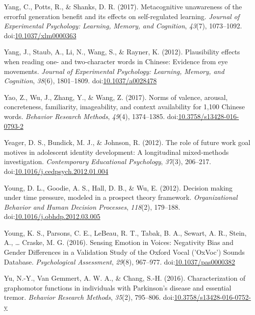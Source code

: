 \documentclass[english,man]{apa6}
\theoremstyle{definition}
\theoremstyle{definition}
\theoremstyle{definition}
\theoremstyle{remark}
\begin{document}
\hypertarget{ref-Yang2017}{}
Yang, C., Potts, R., \& Shanks, D. R. (2017). Metacognitive unawareness
of the errorful generation benefit and its effects on self-regulated
learning. \emph{Journal of Experimental Psychology: Learning, Memory,
and Cognition}, \emph{43}(7), 1073--1092.
doi:\href{https://doi.org/10.1037/xlm0000363}{10.1037/xlm0000363}

\hypertarget{ref-Yang2012}{}
Yang, J., Staub, A., Li, N., Wang, S., \& Rayner, K. (2012).
Plausibility effects when reading one- and two-character words in
Chinese: Evidence from eye movements. \emph{Journal of Experimental
Psychology: Learning, Memory, and Cognition}, \emph{38}(6), 1801--1809.
doi:\href{https://doi.org/10.1037/a0028478}{10.1037/a0028478}

\hypertarget{ref-Yao2017}{}
Yao, Z., Wu, J., Zhang, Y., \& Wang, Z. (2017). Norms of valence,
arousal, concreteness, familiarity, imageability, and context
availability for 1,100 Chinese words. \emph{Behavior Research Methods},
\emph{49}(4), 1374--1385.
doi:\href{https://doi.org/10.3758/s13428-016-0793-2}{10.3758/s13428-016-0793-2}

\hypertarget{ref-Yeager2012}{}
Yeager, D. S., Bundick, M. J., \& Johnson, R. (2012). The role of future
work goal motives in adolescent identity development: A longitudinal
mixed-methods investigation. \emph{Contemporary Educational Psychology},
\emph{37}(3), 206--217.
doi:\href{https://doi.org/10.1016/j.cedpsych.2012.01.004}{10.1016/j.cedpsych.2012.01.004}

\hypertarget{ref-Young2012}{}
Young, D. L., Goodie, A. S., Hall, D. B., \& Wu, E. (2012). Decision
making under time pressure, modeled in a prospect theory framework.
\emph{Organizational Behavior and Human Decision Processes},
\emph{118}(2), 179--188.
doi:\href{https://doi.org/10.1016/j.obhdp.2012.03.005}{10.1016/j.obhdp.2012.03.005}

\hypertarget{ref-Young2016}{}
Young, K. S., Parsons, C. E., LeBeau, R. T., Tabak, B. A., Sewart, A.
R., Stein, A., \ldots{} Craske, M. G. (2016). Sensing Emotion in Voices:
Negativity Bias and Gender Differences in a Validation Study of the
Oxford Vocal ('OxVoc') Sounds Database. \emph{Psychological Assessment},
\emph{29}(8), 967--977.
doi:\href{https://doi.org/10.1037/pas0000382}{10.1037/pas0000382}

\hypertarget{ref-Yu2016}{}
Yu, N.-Y., Van Gemmert, A. W. A., \& Chang, S.-H. (2016).
Characterization of graphomotor functions in individuals with
Parkinson's disease and essential tremor. \emph{Behavior Research
Methods}, \emph{35}(2), 795--806.
doi:\href{https://doi.org/10.3758/s13428-016-0752-y}{10.3758/s13428-016-0752-y}
\end{document}
